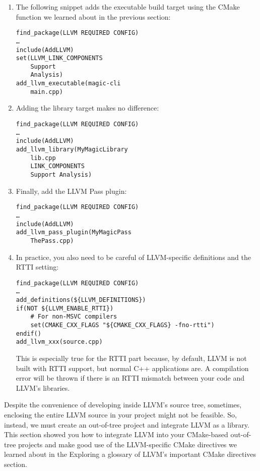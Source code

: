 \begin{enumerate}
\item The following snippet adds the executable build target using the CMake function we learned about in the previous section:

\begin{lstlisting}[style=styleCMake]
find_package(LLVM REQUIRED CONFIG)
…
include(AddLLVM)
set(LLVM_LINK_COMPONENTS
	Support
	Analysis)
add_llvm_executable(magic-cli
	main.cpp)
\end{lstlisting}

\item Adding the library target makes no difference:
\begin{lstlisting}[style=styleCMake]
find_package(LLVM REQUIRED CONFIG)
…
include(AddLLVM)
add_llvm_library(MyMagicLibrary
	lib.cpp
	LINK_COMPONENTS
	Support Analysis)
\end{lstlisting}

\item Finally, add the LLVM Pass plugin:
\begin{lstlisting}[style=styleCMake]
find_package(LLVM REQUIRED CONFIG)
…
include(AddLLVM)
add_llvm_pass_plugin(MyMagicPass
	ThePass.cpp)
\end{lstlisting}

\item In practice, you also need to be careful of LLVM-specific definitions and the RTTI setting:
\begin{lstlisting}[style=styleCMake]
find_package(LLVM REQUIRED CONFIG)
…
add_definitions(${LLVM_DEFINITIONS})
if(NOT ${LLVM_ENABLE_RTTI})
	# For non-MSVC compilers
	set(CMAKE_CXX_FLAGS "${CMAKE_CXX_FLAGS} -fno-rtti")
endif()
add_llvm_xxx(source.cpp)
\end{lstlisting}
This is especially true for the RTTI part because, by default, LLVM is not built with RTTI support, but normal C++ applications are. A compilation error will be thrown if there is an RTTI mismatch between your code and LLVM's libraries.

\end{enumerate}

Despite the convenience of developing inside LLVM's source tree, sometimes, enclosing the entire LLVM source in your project might not be feasible. So, instead, we must create an out-of-tree project and integrate LLVM as a library. This section showed you how to integrate LLVM into your CMake-based out-of-tree projects and make good use of the LLVM-specific CMake directives we learned about in the Exploring a glossary of LLVM's important CMake directives section.


































